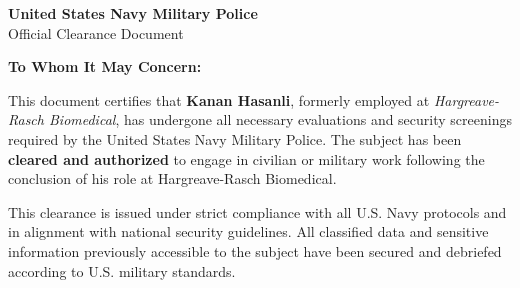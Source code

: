 \documentclass[a4paper,12pt]{article}
\begin{document}
	
	\noindent
	\begin{minipage}{0.7\textwidth}
		\begin{center}
			{\LARGE \textbf{United States Navy Military Police}}\\
			\vspace{0.5cm}
			{\Large Official Clearance Document}
		\end{center}
	\end{minipage}%
	\hfill
	\begin{minipage}{0.25\textwidth}
		\begin{flushright}
		\end{flushright}
	\end{minipage}
	
	\vspace{1cm}
	
	\noindent \textbf{To Whom It May Concern:}
	
	\vspace{0.5cm}
	
	This document certifies that \textbf{Kanan Hasanli}, formerly employed at \textit{Hargreave-Rasch Biomedical}, has undergone all necessary evaluations and security screenings required by the United States Navy Military Police. The subject has been \textbf{cleared and authorized} to engage in civilian or military work following the conclusion of his role at Hargreave-Rasch Biomedical.
	
	\vspace{0.5cm}
	
	This clearance is issued under strict compliance with all U.S. Navy protocols and in alignment with national security guidelines. All classified data and sensitive information previously accessible to the subject have been secured and debriefed according to U.S. military standards.
	
	\vspace{1cm}
	
\end{document}
